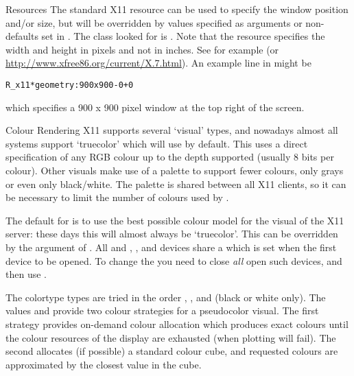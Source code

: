 %
\begin{Section}{Resources}
The standard X11 resource  can be used to specify the
window position and/or size, but will be overridden by values
specified as arguments or non- defaults set in
.  The class looked for is .  Note that
the resource specifies the width and height in pixels and not in
inches.  See for example  (or
\url{http://www.xfree86.org/current/X.7.html}).
An example line in  might be
\begin{alltt}R_x11*geometry: 900x900-0+0
\end{alltt}

which specifies a 900 x 900 pixel window at the top right of the screen.
\end{Section}
%
\begin{Section}{Colour Rendering}
X11 supports several `visual' types, and nowadays almost all
systems support `truecolor' which  will use by
default.  This uses a direct specification of any RGB colour up to the
depth supported (usually 8 bits per colour).  Other visuals make use
of a palette to support fewer colours, only grays or even only
black/white.  The palette is shared between all X11 clients, so it can
be necessary to limit the number of colours used by \R{}.

The default for  is to use the best possible colour
model for the visual of the X11 server: these days this will almost
always be `truecolor'.  This can be overridden by the
 argument of .   All
 and  , ,
 and  devices share a  which is
set when the first device to be opened.  To change the
 you need to close \emph{all} open such devices, and
then use .

The colortype types are tried in the order ,
,  and  (black or white
only).  The values  and  provide
two colour strategies for a pseudocolor visual.  The first strategy
provides on-demand colour allocation which produces exact colours
until the colour resources of the display are exhausted (when plotting
will fail).  The second allocates (if possible) a standard colour
cube, and requested colours are approximated by the closest value in
the cube.


\end{Section}
